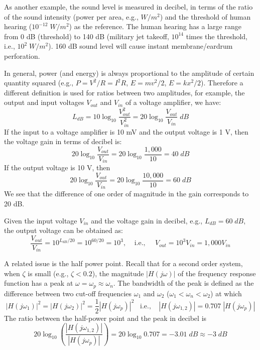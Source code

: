 \documentclass{article}
\begin{document}
As another example, the sound level is measured in decibel, in terms of the ratio
of the sound intensity (power per area, e.g., $W/m^2$) and the threshold of human 
hearing ($10^{-12}\; W/m^2$) as the reference. The human hearing has a large range 
from 0 dB (threshold) to 140 dB (military jet takeoff, $10^{14}$ times the threshold, 
i.e., $10^2\; W/m^2$). 160 dB sound level will cause instant membrane/eardrum 
perforation.

In general, power (and energy) is always proportional to the amplitude of certain
quantity squared (e.g., $P=V^2/R=I^2 R$, $E=mv^2/2$, $E=kx^2/2$). Therefore a 
different definition is used for ratios between two amplitudes, for example, the
output and input voltages $V_{out}$ and $V_{in}$ of a voltage amplifier, we have:
\begin{equation} L_{dB}=10 \log_{10} \frac{V^2_{out}}{V^2_{in}}
=20 \log_{10} \frac{V_{out}}{V_{in}}\;dB \end{equation}
If the input to a voltage amplifier is 10 mV and the output voltage is 1 V, then the
voltage gain in terms of decibel is:
\begin{equation} 20 \log_{10} \frac{V_{out}}{V_{in}}=20 \log_{10} \frac{1,000}{10}=40\; dB \end{equation}
If the output voltage is 10 V, then
\begin{equation} 20 \log_{10} \frac{V_{out}}{V_{in}}=20 \log_{10} \frac{10,000}{10}=60\; dB \end{equation}
We see that the difference of one order of magnitude in the gain corresponds to 20 dB.

Given the input voltage $V_{in}$ and the voltage gain in decibel, e.g., $L_{dB}=60\;dB$, 
the output voltage can be obtained as:
\begin{equation} \frac{V_{out}}{V_{in}}=10^{L_{dB}/20}=10^{60/20}=10^3,
\;\;\;\;\mbox{i.e.,}\;\;\;\;\; V_{out}=10^3 V_{in}=1,000 V_{in} \end{equation}

A related issue is the half power point. Recall that for a second order system, when
$\zeta$ is small (e.g., $\zeta<0.2$), the magnitude $|H(j\omega)|$ of the frequency 
response function has a peak at $\omega=\omega_p\approx \omega_n$. The bandwidth of 
the peak is defined as the difference between two cut-off frequencies $\omega_1$ 
and $\omega_2$ ($\omega_1<\omega_n < \omega_2$) at which 
\begin{equation} |H(j\omega_1)|^2=|H(j\omega_2)|^2=\frac{1}{2} |H(j\omega_p)|^2\;\;\;\mbox{i.e.,}\;\;\;\;
   | H(j\omega_{1,2}) |=0.707\; | H(j\omega_p) | \end{equation}
The ratio between the half-power point and the peak in decibel is
\begin{equation} 20 \log_{10} \left( \frac{ |H(j\omega_{1,2})|}{| H(j\omega_p) |} \right)
=20 \log_{10} 0.707=-3.01\;dB \approx -3\;dB \end{equation}
\end{document}
